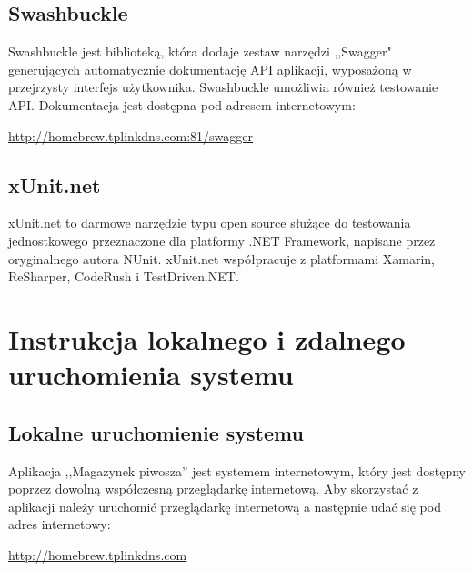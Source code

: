 \documentclass[12pt,a4paper]{article}
\begin{document}
		\subsection{Swashbuckle}
			\indent Swashbuckle jest biblioteką, która dodaje zestaw narzędzi ,,Swagger" generujących automatycznie dokumentację API aplikacji,
				wyposażoną w przejrzysty interfejs użytkownika. Swashbuckle umożliwia również testowanie API. Dokumentacja jest dostępna pod adresem internetowym:
			\begin{tcolorbox}[minipage,colback=white,arc=0pt,outer arc=0pt, fontupper=\scriptsize]
				\center					
				\url{http://homebrew.tplinkdns.com:81/swagger}
			\end{tcolorbox}

		\subsection{xUnit.net}
			\indent xUnit.net to darmowe narzędzie typu open source służące do testowania jednostkowego
			przeznaczone dla platformy .NET Framework, napisane przez oryginalnego autora NUnit.
			xUnit.net współpracuje z platformami Xamarin, ReSharper, CodeRush i TestDriven.NET.
	
	\newpage
		
	\section{Instrukcja lokalnego i zdalnego uruchomienia systemu}
		\subsection{Lokalne uruchomienie systemu}
			\indent Aplikacja ,,Magazynek piwosza'' jest systemem internetowym, który jest dostępny
			poprzez dowolną współczesną przeglądarkę internetową. Aby skorzystać z aplikacji należy
			uruchomić przeglądarkę internetową a następnie udać się pod adres internetowy:
				\begin{tcolorbox}[minipage,colback=white,arc=0pt,outer arc=0pt, fontupper=\scriptsize]
					\center					
					\url{http://homebrew.tplinkdns.com}
				\end{tcolorbox}
			
\end{document}

